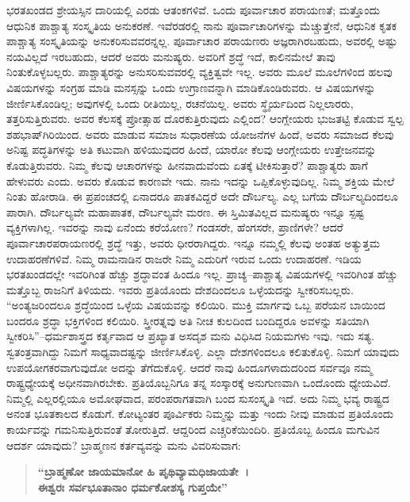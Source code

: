 ಭರತಖಂಡದ ಶ್ರೇಯಸ್ಸಿನ ದಾರಿಯಲ್ಲಿ ಎರಡು ಆತಂಕಗಳಿವೆ. ಒಂದು ಪೂರ್ವಾಚಾರ ಪರಾಯಣತೆ; ಮತ್ತೊಂದು ಆಧುನಿಕ ಪಾಶ್ಚಾತ್ಯ ಸಂಸ್ಕೃತಿಯ ಅನುಕರಣೆ. ಇವೆರಡರಲ್ಲಿ ನಾನು ಪೂರ್ವಾಚಾರಿಗಳನ್ನು ಮೆಚ್ಚುತ್ತೇನೆ, ಆಧುನಿಕ ಕೃತಕ ಪಾಶ್ಚಾತ್ಯ ಸಂಸ್ಕೃತಿಯನ್ನು ಅನುಕರಿಸುವವರನ್ನಲ್ಲ. ಪೂರ್ವಾಚಾರ ಪರಾಯಣರು ಅಜ್ಞರಾಗಿರಬಹುದು, ಅವರಲ್ಲಿ ಅಷ್ಟು ನಯವಿಲ್ಲದೆ ಇರಬಹುದು, ಆದರೆ ಅವರು ಮನುಷ್ಯರು. ಅವರಿಗೆ ಶ್ರದ್ಧೆ ಇದೆ, ಕಾಲಿನಮೇಲೆ ತಾವು ನಿಂತುಕೊಳ್ಳಬಲ್ಲರು. ಪಾಶ್ಚಾತ್ಯರನ್ನು ಅನುಸರಿಸುವವರಲ್ಲಿ ವ್ಯಕ್ತಿತ್ವವೇ ಇಲ್ಲ. ಅವರು ಮೂಲೆ ಮೂಲೆಗಳಿಂದ ಹಲವು ವಿಷಯಗಳನ್ನು ಸಂಗ್ರಹ ಮಾಡಿ ಮನಸ್ಸನ್ನು ಒಂದು ಉಗ್ರಾಣವನ್ನಾಗಿ ಮಾಡಿಕೊಂಡಿರುವರು. ಆ ವಿಷಯಗಳನ್ನು ಜೀರ್ಣಿಸಿಕೊಂಡಿಲ್ಲ; ಅವುಗಳಲ್ಲಿ ಒಂದು ರೀತಿಯಿಲ್ಲ, ರಚನೆಯಿಲ್ಲ. ಅವರು ಸ್ಥೈರ್ಯದಿಂದ ನಿಲ್ಲಲಾರರು, ತತ್ತರಿಸುತ್ತಿರುವರು. ಅವರ ಕೆಲಸಕ್ಕೆ ಪ್ರೋತ್ಸಾಹ ದೊರಕುತ್ತಿರುವುದು ಎಲ್ಲಿಂದ? ಆಂಗ್ಲೇಯರು ಭುಜತಟ್ಟಿ ಕೊಡುವ ಸ್ವಲ್ಪ ಶಹಭಾಷ್​ಗಿರಿಯಿಂದ. ಅವರು ಮಾಡುವ ಸಮಾಜ ಸುಧಾರಣೆಯ ಯೋಜನೆಗಳ ಹಿಂದೆ, ಅವರು ಸಮಾಜದ ಕೆಲವು ಅನಿಷ್ಟ ಪದ್ಧತಿಗಳನ್ನು ಅತಿ ಕಟುವಾಗಿ ಹಳಿಯುವುದರ ಹಿಂದೆ, ಯಾರೋ ಕೆಲವು ಆಂಗ್ಲೇಯರು ಉತ್ತೇಜನವನ್ನು ಕೊಡುತ್ತಿರುವರು. ನಿಮ್ಮ ಕೆಲವು ಆಚಾರಗಳನ್ನು ಹೀನವಾದುವೆಂದು ಏತಕ್ಕೆ ಟೀಕಿಸುತ್ತಾರೆ? ಪಾಶ್ಚಾತ್ಯರು ಹಾಗೆ ಹೇಳುವರು ಎಂದು. ಅವರು ಕೊಡುವ ಕಾರಣವೇ ಇದು. ನಾನು ಇದನ್ನು ಒಪ್ಪಿಕೊಳ್ಳುವುದಿಲ್ಲ. ನಿಮ್ಮ ಶಕ್ತಿಯ ಮೇಲೆ ನಿಂತು ಹೋರಾಡಿ. ಈ ಪ್ರಪಂಚದಲ್ಲಿ ಏನಾದರೂ ಪಾತಕವಿದ್ದರೆ ಅದೇ ದೌರ್ಬಲ್ಯ. ಎಲ್ಲ ಬಗೆಯ ದೌರ್ಬಲ್ಯದಿಂದಲೂ ಪಾರಾಗಿ. ದೌರ್ಬಲ್ಯವೇ ಮಹಾಪಾತಕ, ದೌರ್ಬಲ್ಯವೇ ಮರಣ. ಈ ಸ್ತಿಮಿತವಿಲ್ಲದ ಮನುಷ್ಯರು ಇನ್ನೂ ಸ್ಪಷ್ಟ ವ್ಯಕ್ತಿಗಳಾಗಿಲ್ಲ. ಇವರನ್ನು ನಾವು ಏನೆಂದು ಕರೆಯೋಣ? ಗಂಡಸರೇ, ಹೆಂಗಸರೇ, ಪ್ರಾಣಿಗಳೇ? ಆದರೆ ಪೂರ್ವಾಚಾರಪರಾಯಣರಲ್ಲಿ ಶ್ರದ್ಧೆ ಇತ್ತು, ಅವರು ಧೀರರಾಗಿದ್ದರು. ಇನ್ನೂ ನಮ್ಮಲ್ಲಿ ಕೆಲವು ಅಂತಹ ಅತ್ಯುತ್ತಮ ಉದಾಹರಣೆಗಳಿವೆ. ನಿಮ್ಮ ರಾಮನಾಡಿನ ರಾಜರೇ ನಿಮ್ಮ ಎದುರಿಗೆ ಇರುವ ಒಂದು ಉದಾಹರಣೆ. ಇಡಿಯ ಭರತಖಂಡದಲ್ಲೇ ಇವರಿಗಿಂತ ಹೆಚ್ಚು ಶ್ರದ್ಧಾವಂತ ಹಿಂದೂ ಇಲ್ಲ. ಪ್ರಾಚ್ಯ–ಪಾಶ್ಚಾತ್ಯ ವಿಷಯಗಳಲ್ಲಿ ಇವರಿಗಿಂತ ಹೆಚ್ಚು ಮತ್ತೊಬ್ಬ ರಾಜನಿಗೆ ತಿಳಿಯದು. ಇವರು ಪ್ರತಿಯೊಂದು ದೇಶದಿಂದಲೂ ಒಳ್ಳೆಯದನ್ನು ಸ್ವೀಕರಿಸಬಲ್ಲರು. “ಅಂತ್ಯಜರಿಂದಲೂ ಶ್ರದ್ಧೆಯಿಂದ ಒಳ್ಳೆಯ ವಿಷಯವನ್ನು ಕಲಿಯಿರಿ. ಮುಕ್ತಿ ಮಾರ್ಗವು ಒಬ್ಬ ಪರೆಯನ ಬಾಯಿಂದ ಬಂದರೂ ಶ್ರದ್ಧಾ ಭಕ್ತಿಗಳಿಂದ ಕಲಿಯಿರಿ. ಸ್ತ್ರೀರತ್ನವು ಅತಿ ನೀಚ ಕುಲದಿಂದ ಬಂದಿದ್ದರೂ ಅವಳನ್ನು ಸತಿಯಾಗಿ ಸ್ವೀಕರಿಸಿ”–ಧರ್ಮಶಾಸ್ತ್ರದ ಕರ್ತೃವಾದ ಆ ಪ್ರಖ್ಯಾತ ಅಸದೃಶ ಮನು ವಿಧಿಸಿದ ನಿಯಮಗಳು ಇವು. ಇದು ಸತ್ಯ. ಸ್ವತಂತ್ರವಾಗಿದ್ದು ನಿಮಗೆ ಸಾಧ್ಯವಾದಷ್ಟನ್ನು ಜೀರ್ಣಿಸಿಕೊಳ್ಳಿ. ಎಲ್ಲಾ ದೇಶಗಳಿಂದಲೂ ಕಲಿತುಕೊಳ್ಳಿ. ನಿಮಗೆ ಯಾವುದು ಉಪಯೋಗಕರವಾಗುವುದೋ ಅದನ್ನು ತೆಗೆದುಕೊಳ್ಳಿ. ಆದರೆ ನಾವು ಹಿಂದೂಗಳಾದುದರಿಂದ ಸರ್ವವೂ ನಮ್ಮ ರಾಷ್ಟ್ರಧ್ಯೇಯಕ್ಕೆ ಅಧೀನವಾಗಿರಬೇಕು. ಪ್ರತಿಯೊಬ್ಬನಿಗೂ ತನ್ನ ಸಂಸ್ಕಾರಕ್ಕೆ ಅನುಗುಣವಾಗಿ ಒಂದೊಂದು ಧ್ಯೇಯವಿದೆ. ನಿಮ್ಮಲ್ಲಿ ಎಲ್ಲರಲ್ಲಿಯೂ ಅಮೋಘವಾದ, ಪರಂಪರಾಗತವಾಗಿ ಬಂದ ಸುಸಂಸ್ಕೃತಿ ಇದೆ. ಅದು ನಿಮ್ಮ ಭವ್ಯ ರಾಷ್ಟ್ರದ ಅನಂತ ಭೂತಕಾಲದ ಕೊಡುಗೆ. ಕೋಟ್ಯಂತರ ಪೂರ್ವಿಕರು ನಿಮ್ಮನ್ನು ಮತ್ತು ಇಂದು ನೀವು ಮಾಡುವ ಪ್ರತಿಯೊಂದು ಕಾರ್ಯವನ್ನು ಗಮನಿಸುತ್ತಿರುವಂತೆ ತೋರುತ್ತಿದೆ. ಆದ್ದರಿಂದ ಎಚ್ಚರಿಕೆಯಿಂದಿರಿ. ಪ್ರತಿಯೊಬ್ಬ ಹಿಂದೂ ಮಗುವಿನ ಆದರ್ಶ ಯಾವುದು? ಬ್ರಾಹ್ಮಣನ ಕರ್ತವ್ಯವನ್ನು ಮನು ವಿವರಿಸುವಾಗ:

\begin{verse}
\textbf{“ಬ್ರಾಹ್ಮಣೋ ಜಾಯಮಾನೋ ಹಿ ಪೃಥಿವ್ಯಾಮಧಿಜಾಯತೇ~।}\\\textbf{ಈಶ್ವರಃ ಸರ್ವಭೂತಾನಾಂ ಧರ್ಮಕೋಶಸ್ಯ ಗುಪ್ತಯೇ”}
\end{verse}

